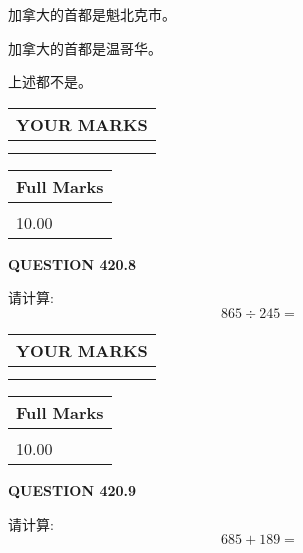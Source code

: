\documentclass{ctexart}
\begin{document}
 
加拿大的首都是魁北克市。
 
 
加拿大的首都是温哥华。
 
 
 上述都不是。
 
 
  
\vspace{0.2in}
  
\noindent\begin{tabular}{|l|}
\hline
 YOUR MARKS  \\
\hline
 \\ 
 \\ 
\hline
\end{tabular}
\hspace{0.05in} \begin{tabular}{|l|}
\hline
 Full Marks  \\
\hline
 \\ 
10.00 \\
\hline
\end{tabular}
{\textbf{\Large{QUESTION
420.8 
}}}
  
  
 
请计算:
\begin{equation}
865  \div    %
245 = \nonumber
\end{equation}
 

 

 
  
\vspace{0.2in}
  
\noindent\begin{tabular}{|l|}
\hline
 YOUR MARKS  \\
\hline
 \\ 
 \\ 
\hline
\end{tabular}
\hspace{0.05in} \begin{tabular}{|l|}
\hline
 Full Marks  \\
\hline
 \\ 
10.00 \\
\hline
\end{tabular}
{\textbf{\Large{QUESTION
420.9 
}}}
  
  
 
请计算:
\begin{equation}
685 +  %
189 = \nonumber
\end{equation}
 

 
\end{document}
